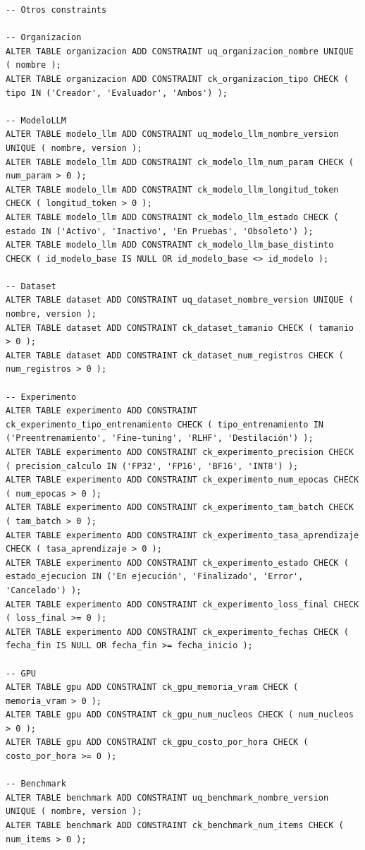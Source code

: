 \documentclass[12pt,a4paper]{article}
\begin{document}
\begin{lstlisting}
-- Otros constraints

-- Organizacion
ALTER TABLE organizacion ADD CONSTRAINT uq_organizacion_nombre UNIQUE ( nombre );
ALTER TABLE organizacion ADD CONSTRAINT ck_organizacion_tipo CHECK ( tipo IN ('Creador', 'Evaluador', 'Ambos') );

-- ModeloLLM
ALTER TABLE modelo_llm ADD CONSTRAINT uq_modelo_llm_nombre_version UNIQUE ( nombre, version );
ALTER TABLE modelo_llm ADD CONSTRAINT ck_modelo_llm_num_param CHECK ( num_param > 0 );
ALTER TABLE modelo_llm ADD CONSTRAINT ck_modelo_llm_longitud_token CHECK ( longitud_token > 0 );
ALTER TABLE modelo_llm ADD CONSTRAINT ck_modelo_llm_estado CHECK ( estado IN ('Activo', 'Inactivo', 'En Pruebas', 'Obsoleto') );
ALTER TABLE modelo_llm ADD CONSTRAINT ck_modelo_llm_base_distinto CHECK ( id_modelo_base IS NULL OR id_modelo_base <> id_modelo );

-- Dataset
ALTER TABLE dataset ADD CONSTRAINT uq_dataset_nombre_version UNIQUE ( nombre, version );
ALTER TABLE dataset ADD CONSTRAINT ck_dataset_tamanio CHECK ( tamanio > 0 );
ALTER TABLE dataset ADD CONSTRAINT ck_dataset_num_registros CHECK ( num_registros > 0 );

-- Experimento
ALTER TABLE experimento ADD CONSTRAINT ck_experimento_tipo_entrenamiento CHECK ( tipo_entrenamiento IN ('Preentrenamiento', 'Fine-tuning', 'RLHF', 'Destilación') );
ALTER TABLE experimento ADD CONSTRAINT ck_experimento_precision CHECK ( precision_calculo IN ('FP32', 'FP16', 'BF16', 'INT8') );
ALTER TABLE experimento ADD CONSTRAINT ck_experimento_num_epocas CHECK ( num_epocas > 0 );
ALTER TABLE experimento ADD CONSTRAINT ck_experimento_tam_batch CHECK ( tam_batch > 0 );
ALTER TABLE experimento ADD CONSTRAINT ck_experimento_tasa_aprendizaje CHECK ( tasa_aprendizaje > 0 );
ALTER TABLE experimento ADD CONSTRAINT ck_experimento_estado CHECK ( estado_ejecucion IN ('En ejecución', 'Finalizado', 'Error', 'Cancelado') );
ALTER TABLE experimento ADD CONSTRAINT ck_experimento_loss_final CHECK ( loss_final >= 0 );
ALTER TABLE experimento ADD CONSTRAINT ck_experimento_fechas CHECK ( fecha_fin IS NULL OR fecha_fin >= fecha_inicio );

-- GPU
ALTER TABLE gpu ADD CONSTRAINT ck_gpu_memoria_vram CHECK ( memoria_vram > 0 );
ALTER TABLE gpu ADD CONSTRAINT ck_gpu_num_nucleos CHECK ( num_nucleos > 0 );
ALTER TABLE gpu ADD CONSTRAINT ck_gpu_costo_por_hora CHECK ( costo_por_hora >= 0 );

-- Benchmark
ALTER TABLE benchmark ADD CONSTRAINT uq_benchmark_nombre_version UNIQUE ( nombre, version );
ALTER TABLE benchmark ADD CONSTRAINT ck_benchmark_num_items CHECK ( num_items > 0 );


\end{lstlisting}
\end{document}
